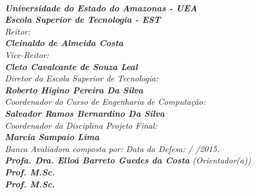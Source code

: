 \begin{spacing}{1.4}
\textit{\textbf{\\
Universidade do Estado do Amazonas - UEA\\
Escola Superior de Tecnologia - EST}}
\textit{\\
Reitor:\\
\textbf{Cleinaldo de Almeida Costa}\\
Vice-Reitor:\\ \textbf{Cleto Cavalcante de Souza Leal}}
\\
\textit{
Diretor da Escola Superior de Tecnologia:\\
\textbf{Roberto Higino Pereira Da Silva}}
\\
\textit{
Coordenador do Curso de Engenharia de Computação:\\
\textbf{Salvador Ramos Bernardino Da Silva}}
\\
\textit{
Coordenador da Disciplina Projeto Final:\\
\textbf{Marcia Sampaio Lima}}
\\[12pt]
\textit{
Banca Avaliadora composta por: \hfill Data da Defesa:  /  /2015.\\
}
\textit{
\textbf{Profa. Dra. Elloá Barreto Guedes da Costa} (Orientador(a))\\
\textbf{Prof. M.Sc. }\\%
\textbf{Prof. M.Sc. }
}
\ \ \\
 \begin{small}
\begin{center}
\end{center}
\end{small}
\end{spacing}
 \newpage
